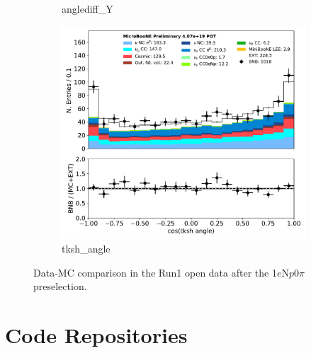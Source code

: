 \documentclass[a4paper]{article}
\newcommand{\npsel}{1$e$N$p$0$\pi$ }
\begin{document}
\begin{figure}[H]
\begin{center}
\begin{subfigure}[b]{0.3\textwidth}
    \caption{\label{fig:1eNp:dataMCRun1:anglediff_Y} anglediff\_Y }
    \end{subfigure}
    \begin{subfigure}[b]{0.3\textwidth}
    \centering
    \includegraphics[width=1.00\textwidth]{1eNp/dataMCRun1/tksh_angle01152020.pdf}
    \caption{\label{fig:1eNp:dataMCRun1:tksh_angle} tksh\_angle }
    \end{subfigure}
\caption{\label{fig:1eNp:dataMCRun1:pi02}Data-MC comparison in the Run1 open data after the \npsel preselection.}
\end{center}
\end{figure}


\section{Code Repositories}
\end{document}
